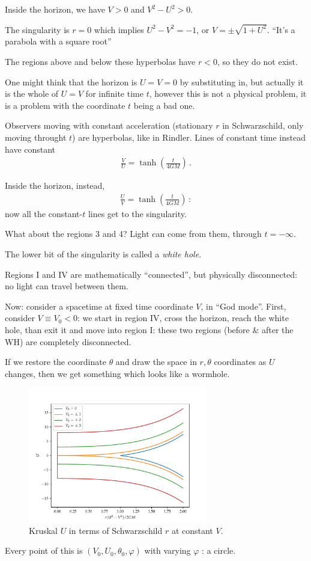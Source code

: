 \documentclass[main.tex]{subfiles}
\begin{document}
Inside the horizon, we have \(V>0\) and \(V^2-U^2>0\). 

The singularity is \(r=0\) which implies \(U^2- V^2 = -1\), or \(V = \pm \sqrt{1 + U^2}\). 
``It's a parabola with a square root'' 

The regions above and below these hyperbolas have \(r<0\), so they do not exist. 

One might think that the horizon is \(U = V = 0\) by substituting in, but actually it is the whole of \(U = V\) for infinite time \(t\), however this is not a physical problem, it is a problem with the coordinate \(t\) being a bad one. 

Observers moving with constant acceleration (stationary \(r\) in Schwarzschild, only moving throught \(t\)) are hyperbolas, like in Rindler. Lines of constant time instead have constant 
%
\begin{align}
  \frac{V}{U} = \tanh(\frac{t}{4GM})
\,.
\end{align}

Inside the horizon, instead, 
 \begin{align}
   \frac{U}{V} = \tanh(\frac{t}{4GM})
 \,:
 \end{align}
now all the constant-\(t\) lines get to the singularity. 

What about the regions 3 and 4? Light can come from them, through \(t = - \infty\). 

The lower bit of the singularity is called a \emph{white hole}. 

Regions I and IV are mathematically ``connected'', but physically disconnected: no light can travel between them. 

Now: consider a spacetime at fixed time coordinate \(V\), in ``God mode''. 
First, consider \(V \equiv V_0 < 0\): we start in region IV, cross the horizon, reach the white hole, than exit it and move into region I: these two regions (before \& after the WH) are completely disconnected.   


If we restore the coordinate \(\theta \) and draw the space in \(r, \theta \) coordinates as \(U\) changes, then we get something which looks like a wormhole. 

\begin{figure}[ht]
  \centering
  \includegraphics[width=0.7\textwidth]{figures/kruskal_constant_V.pdf}
  \caption{Kruskal \(U\) in terms of Schwarzschild \(r\) at constant \(V\).}
  \label{fig:kruskal-constant-V}
\end{figure}

Every point of this is \((V_0, U_0 , \theta_0 ,  \varphi  )\) with varying \(\varphi \) : a circle.  
\end{document}

